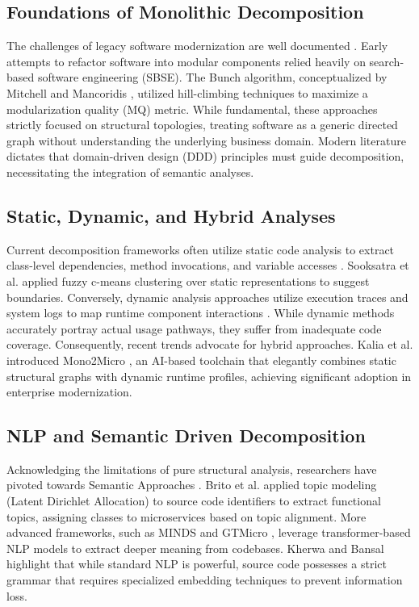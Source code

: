 \documentclass[12pt, a4paper]{article}
\begin{document}
\subsection{Foundations of Monolithic Decomposition}
The challenges of legacy software modernization are well documented \cite{wolfart2021, romani2022}. Early attempts to refactor software into modular components relied heavily on search-based software engineering (SBSE). The Bunch algorithm, conceptualized by Mitchell and Mancoridis \cite{mitchell2007}, utilized hill-climbing techniques to maximize a modularization quality (MQ) metric. While fundamental, these approaches strictly focused on structural topologies, treating software as a generic directed graph without understanding the underlying business domain. Modern literature \cite{abgaz2023, oumoussa2024} dictates that domain-driven design (DDD) principles must guide decomposition, necessitating the integration of semantic analyses.

\subsection{Static, Dynamic, and Hybrid Analyses}
Current decomposition frameworks often utilize static code analysis to extract class-level dependencies, method invocations, and variable accesses \cite{kamimura2018, krause2020}. Sooksatra et al. \cite{sooksatra2024} applied fuzzy c-means clustering over static representations to suggest boundaries. Conversely, dynamic analysis approaches utilize execution traces and system logs \cite{liu2022} to map runtime component interactions \cite{jin2021}. While dynamic methods accurately portray actual usage pathways, they suffer from inadequate code coverage. Consequently, recent trends advocate for hybrid approaches. Kalia et al. introduced Mono2Micro \cite{kalia2020, kalia2021}, an AI-based toolchain that elegantly combines static structural graphs with dynamic runtime profiles, achieving significant adoption in enterprise modernization.

\subsection{NLP and Semantic Driven Decomposition}
Acknowledging the limitations of pure structural analysis, researchers have pivoted towards Semantic Approaches \cite{aitmansour2025semantic}. Brito et al. \cite{brito2021} applied topic modeling (Latent Dirichlet Allocation) to source code identifiers to extract functional topics, assigning classes to microservices based on topic alignment. More advanced frameworks, such as MINDS \cite{aitmansour2025minds} and GTMicro \cite{bajaj2024}, leverage transformer-based NLP models to extract deeper meaning from codebases. Kherwa and Bansal \cite{kherwa2019} highlight that while standard NLP is powerful, source code possesses a strict grammar that requires specialized embedding techniques \cite{aldebagy2021} to prevent information loss.
\end{document}
